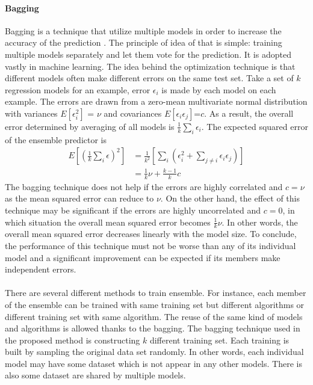 \paragraph{Bagging}
\label{adp_sec:ml_bagging}
Bagging is a technique that utilize multiple models in order to increase the accuracy of the prediction \citep{Breiman1996}.
The principle of idea of that is simple: training multiple models separately and let them vote for the prediction.
It is adopted vastly in machine learning.
The idea behind the optimization technique is that different models often make different errors on the same test set.
Take a set of $k$ regression models for an example, error $\epsilon_i$ is made by each model on each example.
The errors are drawn from a zero-mean multivariate normal distribution with variances $E[\epsilon_i^2]$ = $\nu$ and covariances $E[\epsilon_i \epsilon_j]$=$c$.
As a result, the overall error determined by averaging of all models is $\frac{1}{k}\sum_i \epsilon_i$.
The expected squared error of the ensemble predictor is
\begin{equation}
    \begin{aligned}
    E[(\frac{1}{k} \sum_i \epsilon)^2] &=
    \frac{1}{k^2}[
        \sum_i (
            \epsilon_i^2 + \sum_{j\neq i}\epsilon_i \epsilon_j
        )
    ] \\
    &= \frac{1}{k}\nu + \frac{k-1}{k}c
    \end{aligned}
\end{equation}
%
The bagging technique does not help if the errors are highly correlated and $c=\nu$ as the mean squared error can reduce to $\nu$.
On the other hand, the effect of this technique may be significant if the errors are highly uncorrelated and $c=0$, in which situation the overall mean squared error becomes $\frac{1}{k}\nu$.
In other words, the overall mean squared error decreases linearly with the model size.
To conclude, the performance of this technique must not be worse than any of its individual model and a significant improvement can be expected if its members make independent errors.

\paragraph{}
There are several different methods to train ensemble.
For instance, each member of the ensemble can be trained with same training set but different algorithms or different training set with same algorithm.
The reuse of the same kind of models and algorithms is allowed thanks to the bagging.
The bagging technique used in the proposed method is constructing $k$ different training set.
Each training is built by sampling the original data set randomly.
In other words, each individual model may have some dataset which is not appear in any other models.
There is also some dataset are shared by multiple models.


